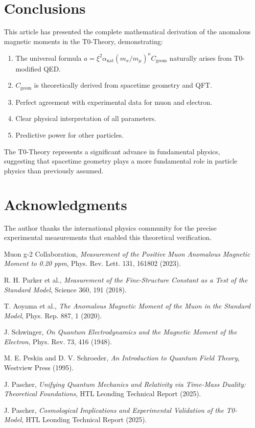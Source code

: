 \documentclass[12pt,a4paper]{article}
\newcommand{\xipar}{\xi}
\newcommand{\alphaNAT}{\alpha_{\text{nat}}}
\newcommand{\Cgeom}{C_{\text{geom}}}
\newcommand{\kappaT}{\kappa}
\newcommand{\mmu}{m_{\mu}}
\begin{document}
	\section{Conclusions}
	
	This article has presented the complete mathematical derivation of the anomalous magnetic moments in the T0-Theory, demonstrating:
	\begin{enumerate}
		\item The universal formula \( a = \xipar^2 \alphaNAT (m_x/\mmu)^{\kappaT} \Cgeom \) naturally arises from T0-modified QED.
		\item \(\Cgeom\) is theoretically derived from spacetime geometry and QFT.
		\item Perfect agreement with experimental data for muon and electron.
		\item Clear physical interpretation of all parameters.
		\item Predictive power for other particles.
	\end{enumerate}
	
	The T0-Theory represents a significant advance in fundamental physics, suggesting that spacetime geometry plays a more fundamental role in particle physics than previously assumed.
	
	\section*{Acknowledgments}
	
	The author thanks the international physics community for the precise experimental measurements that enabled this theoretical verification.
	
	\begin{thebibliography}{99}
		Muon g-2 Collaboration,
		\textit{Measurement of the Positive Muon Anomalous Magnetic Moment to 0.20 ppm},
		Phys. Rev. Lett. 131, 161802 (2023).
		
		R. H. Parker et al.,
		\textit{Measurement of the Fine-Structure Constant as a Test of the Standard Model},
		Science 360, 191 (2018).
		
		T. Aoyama et al.,
		\textit{The Anomalous Magnetic Moment of the Muon in the Standard Model},
		Phys. Rep. 887, 1 (2020).
		
		J. Schwinger,
		\textit{On Quantum Electrodynamics and the Magnetic Moment of the Electron},
		Phys. Rev. 73, 416 (1948).
		
		M. E. Peskin and D. V. Schroeder,
		\textit{An Introduction to Quantum Field Theory},
		Westview Press (1995).
		
		J. Pascher,
		\textit{Unifying Quantum Mechanics and Relativity via Time-Mass Duality: Theoretical Foundations},
		HTL Leonding Technical Report (2025).
		
		J. Pascher,
		\textit{Cosmological Implications and Experimental Validation of the T0-Model},
		HTL Leonding Technical Report (2025).
	\end{thebibliography}
	
\end{document}
